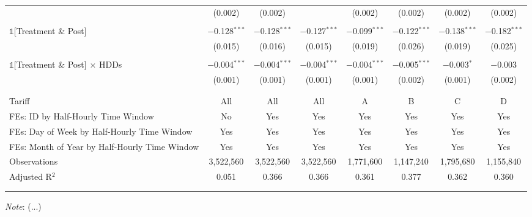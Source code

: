 \begin{table}[!htbp]
\begin{adjustbox}{scale = 0.8}
\begin{tabular}{@{\extracolsep{5pt}}lccccccc}
& (0.002) & (0.002) & & (0.002) & (0.002) & (0.002) & (0.002) \\
& & & & & & & \\
$\mathbb{1}$[Treatment \& Post] & $-$0.128$^{***}$ & $-$0.128$^{***}$ & $-$0.127$^{***}$ & $-$0.099$^{***}$ & $-$0.122$^{***}$ & $-$0.138$^{***}$ & $-$0.182$^{***}$ \\
& (0.015) & (0.016) & (0.015) & (0.019) & (0.026) & (0.019) & (0.025) \\
& & & & & & & \\
$\mathbb{1}$[Treatment \& Post] $\times$ HDDs & $-$0.004$^{***}$ & $-$0.004$^{***}$ & $-$0.004$^{***}$ & $-$0.004$^{***}$ & $-$0.005$^{***}$ & $-$0.003$^{*}$ & $-$0.003 \\
& (0.001) & (0.001) & (0.001) & (0.001) & (0.002) & (0.001) & (0.002) \\
& & & & & & & \\
\hline
\\[-2.0ex]
Tariff & All & All & All & A & B & C & D \\
FEs: ID by Half-Hourly Time Window & No & Yes & Yes & Yes & Yes & Yes & Yes \\
FEs: Day of Week by Half-Hourly Time Window & Yes & Yes & Yes & Yes & Yes & Yes & Yes \\
FEs: Month of Year by Half-Hourly Time Window & Yes & Yes & Yes & Yes & Yes & Yes & Yes \\
Observations & 3,522,560 & 3,522,560 & 3,522,560 & 1,771,600 & 1,147,240 & 1,795,680 & 1,155,840 \\
Adjusted R$^{2}$ & 0.051 & 0.366 & 0.366 & 0.361 & 0.377 & 0.362 & 0.360 \\
\\[-2.0ex]
\hline \hline
\\[-4.5ex]
\end{tabular}
\end{adjustbox}
\begin{tablenotes}
    \footnotesize
    \textit{Note}: (...)  %
\end{tablenotes}
\label{Table:}  %
\end{table}
